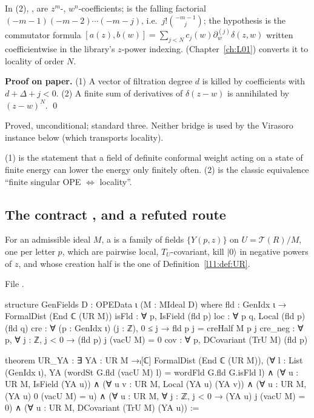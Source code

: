 \begin{dictionary}
In (2), ,  are $z^m$-, $w^n$-coefficients; \allowbreak{} is the falling factorial
$(-m-1)(-m-2)\cdots(-m-j)$, i.e.\ $j!\binom{-m-1}{j}$; the hypothesis is the commutator formula
$[a(z),b(w)] = \sum_{j<N}c_j(w)\partial_w^{(j)}\delta(z,w)$ written coefficientwise in the library's $z$-power indexing.
 (Chapter~\ref{ch:L01}) converts it to locality of order $N$.
\end{dictionary}

\textbf{Proof on paper.} (1) A vector of filtration degree $d$ is killed by coefficients with $d+\Delta+j<0$. (2) A finite sum of
derivatives of $\delta(z-w)$ is annihilated by $(z-w)^N$. \qed

\begin{status}
Proved, unconditional; standard three. Neither bridge is used by the Virasoro instance below (which transports locality).
\end{status}

\begin{physics}
(1) is the statement that a field of definite conformal weight acting on a state of finite energy can lower the energy only
finitely often. (2) is the classic equivalence ``finite singular OPE $\Leftrightarrow$ locality''.
\end{physics}

\subsection{The contract \texorpdfstring{}{GenFields}, and a refuted route}

\begin{definition}\label{l11:def:genfields}
For an admissible ideal $M$, a \emph{} is a family of fields $\{Y(p,z)\}$ on $U = \mathcal T(R)/M$, one per letter $p$,
which are pairwise local, $T_U$-covariant, kill $|0\rangle$ in negative powers of $z$, and whose creation half is the one of
Definition~\ref{l11:def:UR}.
\end{definition}
\noindent File .
\begin{leancode}
structure GenFields {D : OPEData ι} (M : MIdeal D) where
  fld : GenIdx ι → FormalDist (End ℂ (UR M))
  isFld : ∀ p, IsField (fld p)
  loc : ∀ p q, Local (fld p) (fld q)
  cre : ∀ (p : GenIdx ι) (j : ℤ), 0 ≤ j → fld p j = creHalf M p j
  cre_neg : ∀ p, ∀ j : ℤ, j < 0 → (fld p) j (vacU M) = 0
  cov : ∀ p, DCovariant (TrU M) (fld p)

theorem UR_YA :
    ∃ YA : UR M →ₗ[ℂ] FormalDist (End ℂ (UR M)),
      (∀ l : List (GenIdx ι), YA (wordSt G.fld (vacU M) l) = wordFld G.fld G.isFld l) ∧
      (∀ u : UR M, IsField (YA u)) ∧
      (∀ u v : UR M, Local (YA u) (YA v)) ∧
      (∀ u : UR M, (YA u) 0 (vacU M) = u) ∧
      (∀ u : UR M, ∀ j : ℤ, j < 0 → (YA u) j (vacU M) = 0) ∧
      (∀ u : UR M, DCovariant (TrU M) (YA u)) :=
\end{leancode}

